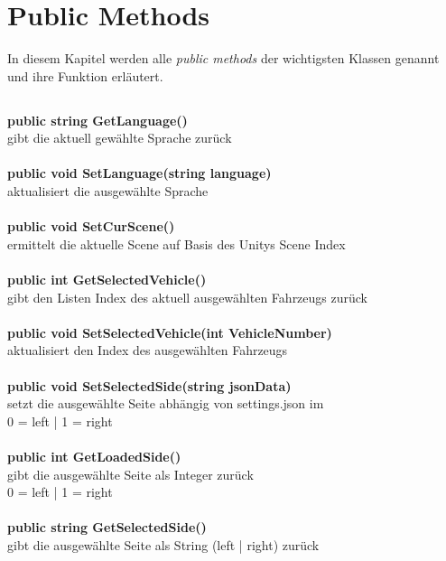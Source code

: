 \chapter{Public Methods}
\label{cha:public_meth}
%
In diesem Kapitel werden alle \emph{public methods} der wichtigsten Klassen genannt und ihre Funktion erläutert.
%
\section{\ssc}
\label{sec:statemeth}
%
\textbf{public string GetLanguage()}\\
gibt die aktuell gewählte Sprache zurück\\
\\
\textbf{public void SetLanguage(string language)}\\
aktualisiert die ausgewählte Sprache\\
\\
\textbf{public void SetCurScene()}\\
ermittelt die aktuelle Scene auf Basis des Unitys Scene Index\\
\\
\textbf{public int GetSelectedVehicle()}\\
gibt den Listen Index des aktuell ausgewählten Fahrzeugs zurück\\
\\
\textbf{public void SetSelectedVehicle(int VehicleNumber)}\\
aktualisiert den Index des ausgewählten Fahrzeugs\\
\\
\textbf{public void SetSelectedSide(string jsonData)}\\
setzt die ausgewählte Seite abhängig von settings.json im \sad \\
0 = left | 1 = right\\
\\
\textbf{public int GetLoadedSide()}\\
gibt die ausgewählte Seite als Integer zurück\\
0 = left | 1 = right\\
\\
\textbf{public string GetSelectedSide()}\\
gibt die ausgewählte Seite als String (left | right) zurück\\
%
